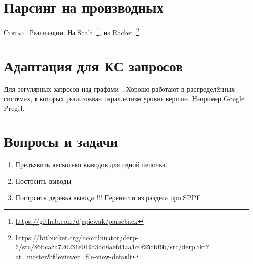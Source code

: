 \section{Парсинг на производных}

Статьи~\cite{DBLP:journals/corr/abs-1010-5023,Adams:2016:CPP:2908080.2908128,Might:2011:PDF:2034574.2034801,andersenparsing}
Реализации.
На Scala~\footnote{\url{https://github.com/djspiewak/parseback}}, на Racket~\footnote{\url{https://bitbucket.org/ucombinator/derp-3/src/86bca8a720231e010a3ad6aefd1aa1c0f35cbf6b/src/derp.rkt?at=master&fileviewer=file-view-default}}.

\section{Адаптация для КС запросов}

Для регулярных запросов над графами~\cite{Nole:2016:RPQ:2949689.2949711}.
Хорошо работают в распределённых системах, в которых реализовван параллелизм уровня вершин. 
Например Google Pregel.



\section{Вопросы и задачи}
\begin{enumerate}
  \item Предъявить несколько выводов для одной цепочки.
  \item Построить выводы
  \item Построить деревья вывода !!! Перенести из раздела про SPPF
\end{enumerate}

